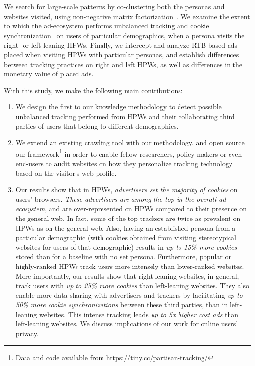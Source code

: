 \documentclass{article}
\newcommand{\hpws}{HPWs\xspace}
\begin{document}
We search for large-scale patterns by co-clustering both the personas and websites visited, using non-negative matrix factorization~\cite{lee1999learning,lahoti2018joint,Zhu:2007:CCL:1277741.1277825}.
We examine the extent to which the ad-ecosystem performs unbalanced tracking and cookie synchronization~\cite{acar2014web,panpap_www2019} on users of particular demographics, when a persona visits the right- or left-leaning \hpws.
Finally, we intercept and analyze RTB-based ads placed when visiting \hpws with particular personas, and establish differences between tracking practices on right and left \hpws, as well as differences in the monetary value of placed ads.

With this study, we make the following main contributions:

\begin{enumerate}
    \item We design the first to our knowledge methodology to detect possible unbalanced tracking performed from \hpws and their collaborating third parties of users that belong to different demographics.
    
    \item We extend an existing crawling tool with our methodology, and open source our framework\footnote{Data and code available from \url{https://tiny.cc/partisan-tracking/}} in order to enable fellow researchers, policy makers or even end-users to audit websites on how they personalize tracking technology based on the visitor's web profile.
    
    \item 
    Our results show that in \hpws, \textit{advertisers set the majority of cookies} on users' browsers.
    \textit{These advertisers are among the top in the overall ad-ecosystem}, and are over-represented on \hpws compared to their presence on the general web. In fact, some of the top trackers are twice as prevalent on \hpws as on the general web.
    Also, having an established persona from a particular demographic (with cookies obtained from visiting stereotypical websites for users of that demographic) results in \textit{up to 15\% more cookies} stored than for a baseline with no set persona.
    Furthermore, popular or highly-ranked \hpws track users more intensely than lower-ranked websites.
    More importantly, our results show that right-leaning websites, in general, track users with \textit{up to 25\% more cookies} than left-leaning websites. 
    They also enable more data sharing with advertisers and trackers by facilitating \textit{up to 50\% more cookie synchronizations} between these third parties, than in left-leaning websites.
    This intense tracking leads \textit{up to 5x higher cost ads} than left-leaning websites.
    We discuss implications of our work for online users' privacy.
    
\end{enumerate}
\end{document}

